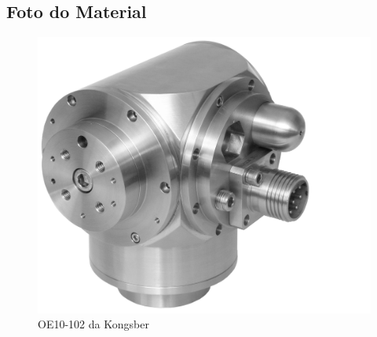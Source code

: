 \newpage
\subsection{Foto do Material}
\begin{figure}[H]
 \centering
 \includegraphics[width=1\columnwidth]{Pan_Tilt/foto}
 \caption{OE10-102 da Kongsber}
\end{figure}


